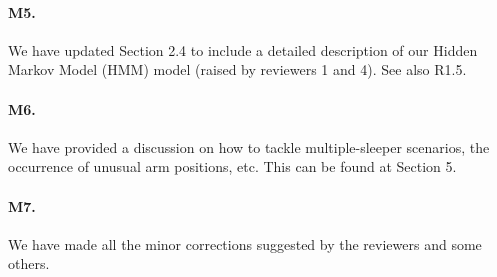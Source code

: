 \paragraph{M5.} We have updated Section 2.4 to include a detailed description of our Hidden Markov Model (HMM) model (raised by reviewers 1 and 4). See also R1.5.


\paragraph{M6.} We have provided a discussion on how to tackle multiple-sleeper scenarios, the occurrence of unusual arm positions, etc. This can be
found at Section 5.

\paragraph{M7.} We have made all the minor corrections suggested by the reviewers and some others.
